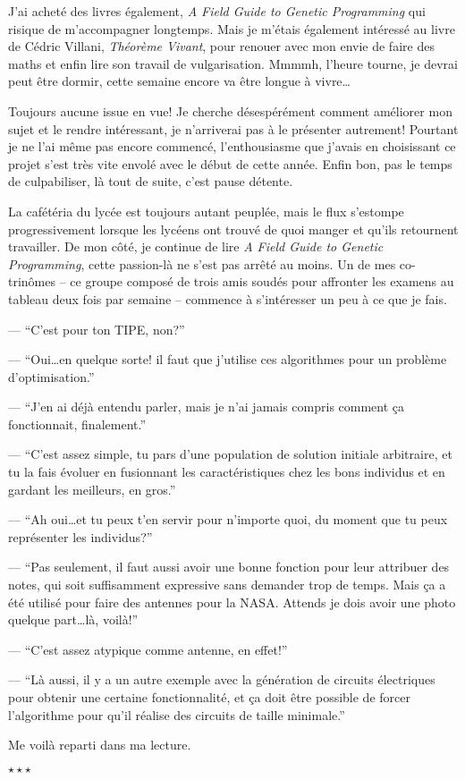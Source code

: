 \documentclass[letterpaper, 12pt]{article} %
\newcommand{\stardelimiter}{{\begin{center}\vspace{0.5cm} $\star \star \star$\vspace{0.58cm}\end{center}}}
\begin{document}
{J'ai acheté des livres également, \textit{A Field Guide to Genetic Programming} qui risique de m'accompagner longtemps.
Mais je m'étais également intéressé au livre de Cédric Villani, \textit{Théorème Vivant}, pour renouer avec mon envie de faire des maths et enfin lire son travail de vulgarisation. 
Mmmmh, l'heure tourne, je devrai peut être dormir, cette semaine encore va être longue à vivre\dots

Toujours aucune issue en vue!
Je cherche désespérément comment améliorer mon sujet et le rendre intéressant, je n'arriverai pas à le présenter autrement!
Pourtant je ne l'ai même pas encore commencé, l'enthousiasme que j'avais en choisissant ce projet s'est très vite envolé avec le début de cette année.
Enfin bon, pas le temps de culpabiliser, là tout de suite, c'est pause détente. 

La cafétéria du lycée est toujours autant peuplée, mais le flux s'estompe progressivement lorsque les lycéens ont trouvé de quoi manger et qu'ils retournent travailler. 
De mon côté, je continue de lire \textit{A Field Guide to Genetic Programming}, cette passion-là ne s'est pas arrêté au moins.
Un de mes co-trinômes -- ce groupe composé de trois amis soudés pour affronter les examens au tableau deux fois par semaine -- commence à s'intéresser un peu à ce que je fais.

--- ``C'est pour ton TIPE, non?''

--- ``Oui\dots en quelque sorte! il faut que j'utilise ces algorithmes pour un problème d'optimisation.''

--- ``J'en ai déjà entendu parler, mais je n'ai jamais compris comment ça fonctionnait, finalement.''

--- ``C'est assez simple, tu pars d'une population de solution initiale arbitraire, et tu la fais évoluer en fusionnant les caractéristiques chez les 			bons individus et en gardant les meilleurs, en gros.''

--- ``Ah oui\dots et tu peux t'en servir pour n'importe quoi, du moment que tu peux représenter les individus?''

--- ``Pas seulement, il faut aussi avoir une bonne fonction pour leur attribuer des notes, qui soit suffisamment expressive sans demander trop de temps. 		Mais ça a été utilisé pour faire des antennes pour la {NASA}. Attends je dois avoir une photo quelque part\dots là, voilà!''

--- ``C'est assez atypique comme antenne, en effet!''

--- ``Là aussi, il y a un autre exemple avec la génération de circuits électriques pour obtenir une certaine fonctionnalité, et ça doit être possible de 			forcer l'algorithme pour qu'il réalise des circuits de taille minimale.''

Me voilà reparti dans ma lecture.

\stardelimiter{}



}
\end{document}
